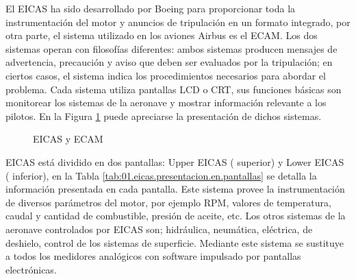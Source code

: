El \ac{EICAS} ha sido desarrollado por Boeing para proporcionar toda la instrumentación del motor y anuncios de tripulación en un formato integrado, 
por otra parte, el sistema utilizado en los aviones Airbus es el \ac{ECAM}. 
Los dos sistemas operan con filosof\'ias diferentes: ambos sistemas producen mensajes de advertencia, precaución y aviso que deben ser evaluados por la tripulación; en ciertos casos, el sistema indica los procedimientos necesarios para abordar el problema. 
Cada sistema utiliza  pantallas LCD o  CRT,  sus funciones básicas son monitorear los sistemas de la aeronave y mostrar información relevante a los pilotos. En la Figura \ref{fig:eicas+ecam} puede apreciarse la presentaci\'on de dichos sistemas.


\begin{figure}[!h]
  \centering
  \caption{EICAS y ECAM}
  \label{fig:eicas+ecam}
\end{figure}


EICAS est\'a dividido en  dos pantallas: Upper EICAS ( superior) y Lower EICAS ( inferior),  
en la Tabla \ref{tab:01.eicas.presentacion.en.pantallas} se detalla la informaci\'on presentada en cada pantalla.%
Este sistema provee la instrumentación de diversos parámetros del motor, por ejemplo RPM, valores de temperatura, caudal y cantidad de combustible, presión de aceite, etc. 
Los otros sistemas de la aeronave controlados por EICAS son; hidráulica, neumática, eléctrica, de deshielo, control de los sistemas de superficie. 
Mediante este sistema se sustituye a todos los medidores analógicos con software impulsado por pantallas electrónicas.

